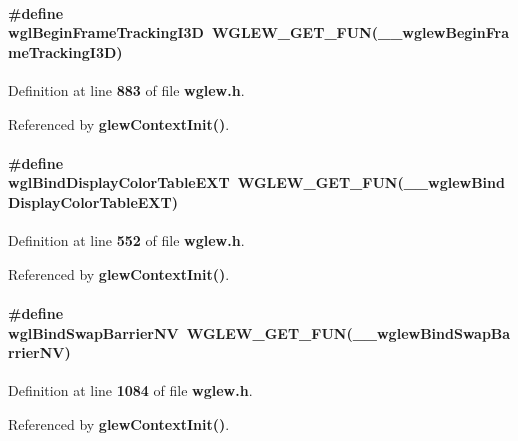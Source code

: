 \paragraph[{wgl\+Begin\+Frame\+Tracking\+I3D}]{\setlength{\rightskip}{0pt plus 5cm}\#define wgl\+Begin\+Frame\+Tracking\+I3D~{\bf W\+G\+L\+E\+W\+\_\+\+G\+E\+T\+\_\+\+F\+UN}({\bf \+\_\+\+\_\+wglew\+Begin\+Frame\+Tracking\+I3D})}\label{wglew_8h_addaac8b0b811921d9f3392fb983115ca}


Definition at line {\bf 883} of file {\bf wglew.\+h}.



Referenced by {\bf glew\+Context\+Init()}.

\paragraph[{wgl\+Bind\+Display\+Color\+Table\+E\+XT}]{\setlength{\rightskip}{0pt plus 5cm}\#define wgl\+Bind\+Display\+Color\+Table\+E\+XT~{\bf W\+G\+L\+E\+W\+\_\+\+G\+E\+T\+\_\+\+F\+UN}({\bf \+\_\+\+\_\+wglew\+Bind\+Display\+Color\+Table\+E\+XT})}\label{wglew_8h_a3eec753ea62cae5d7bc51d8cec5fe5ec}


Definition at line {\bf 552} of file {\bf wglew.\+h}.



Referenced by {\bf glew\+Context\+Init()}.

\paragraph[{wgl\+Bind\+Swap\+Barrier\+NV}]{\setlength{\rightskip}{0pt plus 5cm}\#define wgl\+Bind\+Swap\+Barrier\+NV~{\bf W\+G\+L\+E\+W\+\_\+\+G\+E\+T\+\_\+\+F\+UN}({\bf \+\_\+\+\_\+wglew\+Bind\+Swap\+Barrier\+NV})}\label{wglew_8h_a06cc0ce1d9b063d878c3cb756717b13c}


Definition at line {\bf 1084} of file {\bf wglew.\+h}.



Referenced by {\bf glew\+Context\+Init()}.

